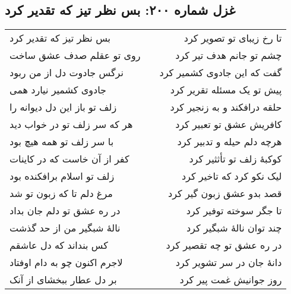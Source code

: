 \begin{center}
\section*{غزل شماره ۲۰۰: بس نظر تیز که تقدیر کرد}
\label{sec:200}
\begin{longtable}{l p{0.5cm} r}
بس نظر تیز که تقدیر کرد
&&
تا رخ زیبای تو تصویر کرد
\\
روی تو عقلم صدف عشق ساخت
&&
چشم تو جانم هدف تیر کرد
\\
نرگس جادوت دل از من ربود
&&
گفت که این جادوی کشمیر کرد
\\
جادوی کشمیر نیارد همی
&&
پیش تو یک مسئله تقریر کرد
\\
زلف تو باز این دل دیوانه را
&&
حلقه درافکند و به زنجیر کرد
\\
هر که سر زلف تو در خواب دید
&&
کافریش عشق تو تعبیر کرد
\\
با سر زلف تو همه هیچ بود
&&
هرچه دلم حیله و تدبیر کرد
\\
کفر از آن خاست که در کاینات
&&
کوکبهٔ زلف تو تأثثیر کرد
\\
زلف تو اسلام برافکنده بود
&&
لیک نکو کرد که تاخیر کرد
\\
مرغ دلم تا که زبون تو شد
&&
قصد بدو عشق زبون گیر کرد
\\
در ره عشق تو دلم جان بداد
&&
تا جگر سوخته توفیر کرد
\\
نالهٔ شبگیر من از حد گذشت
&&
چند توان نالهٔ شبگیر کرد
\\
کس بنداند که دل عاشقم
&&
در ره عشق تو چه تقصیر کرد
\\
لاجرم اکنون چو به دام اوفتاد
&&
دانهٔ جان در سر تشویر کرد
\\
بر دل عطار ببخشای از آنک
&&
روز جوانیش غمت پیر کرد
\\
\end{longtable}
\end{center}
